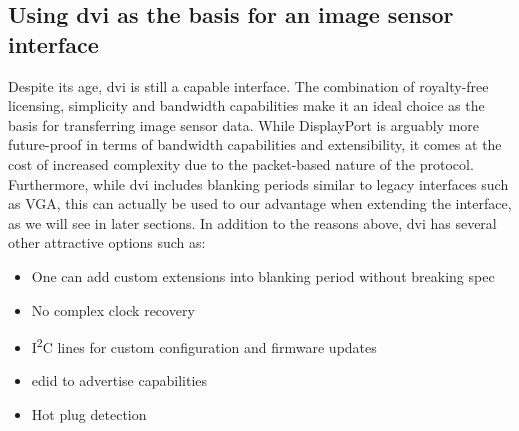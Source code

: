\subsection{Using \gls{dvi} as the basis for an image sensor interface}
Despite its age, \gls{dvi} is still a capable interface. The combination of royalty-free licensing, simplicity and bandwidth capabilities make it an ideal choice as the basis for transferring image sensor data. While DisplayPort is arguably more future-proof in terms of bandwidth capabilities and extensibility, it comes at the cost of increased complexity due to the packet-based nature of the protocol. Furthermore, while \gls{dvi} includes blanking periods similar to legacy interfaces such as VGA, this can actually be used to our advantage when extending the interface, as we will see in later sections. In addition to the reasons above, \gls{dvi} has several other attractive options such as:

\begin{itemize}
  \item{One can add custom extensions into blanking period without breaking spec}
  \item{No complex clock recovery}
  \item{I\textsuperscript{2}C lines for custom configuration and firmware updates}
  \item{\gls{edid} to advertise capabilities}
  \item{Hot plug detection}
\end{itemize}